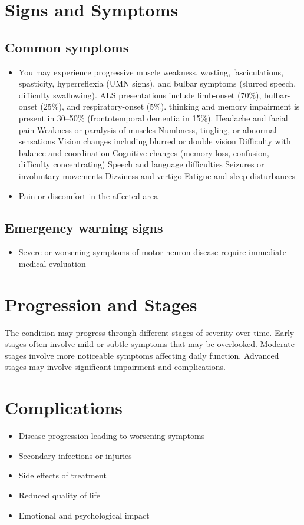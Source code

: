 \section{Signs and Symptoms}
\subsection{Common symptoms}
\begin{itemize}[noitemsep]
  \item You may experience progressive muscle weakness, wasting, fasciculations, spasticity, hyperreflexia (UMN signs), and bulbar symptoms (slurred speech, difficulty swallowing). ALS presentations include limb-onset (70\%), bulbar-onset (25\%), and respiratory-onset (5\%). thinking and memory impairment is present in 30--50\% (frontotemporal dementia in 15\%). Headache and facial pain Weakness or paralysis of muscles Numbness, tingling, or abnormal sensations Vision changes including blurred or double vision Difficulty with balance and coordination Cognitive changes (memory loss, confusion, difficulty concentrating) Speech and language difficulties Seizures or involuntary movements Dizziness and vertigo Fatigue and sleep disturbances
  \item Pain or discomfort in the affected area
  \end{itemize}
\subsection{Emergency warning signs}
\begin{itemize}[noitemsep]
  \item Severe or worsening symptoms of motor neuron disease require immediate medical evaluation
\end{itemize}
\section{Progression and Stages}
The condition may progress through different stages of severity over time. Early stages often involve mild or subtle symptoms that may be overlooked. Moderate stages involve more noticeable symptoms affecting daily function. Advanced stages may involve significant impairment and complications.
\section{Complications}
\begin{itemize}[noitemsep]
  \item Disease progression leading to worsening symptoms
  \item Secondary infections or injuries
  \item Side effects of treatment
  \item Reduced quality of life
  \item Emotional and psychological impact
\end{itemize}
